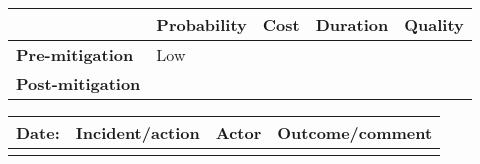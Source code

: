\begin{table}
\begin{tabularx}{\textwidth}{| X |}
	\end{tabularx}
	\begin{tabularx}{\textwidth}{| l | l | X | X | X |}
		\hline
		 &  \textbf{Probability} & \textbf{Cost} & \textbf{Duration} & \textbf{Quality} \\ \hline
		\textbf{Pre-mitigation} & Low & & & \\ \hline
		\textbf{Post-mitigation} & & & & \\ \hline \hline
	\end{tabularx}
	\begin{tabularx}{\textwidth}{| l | X | l | X |}
		\hline
		\textbf{Date:} & \textbf{Incident/action} & \textbf{Actor} & \textbf{Outcome/comment} \\ \hline
		 &  &  &  \\ \hline
	\end{tabularx}
\end{table}


